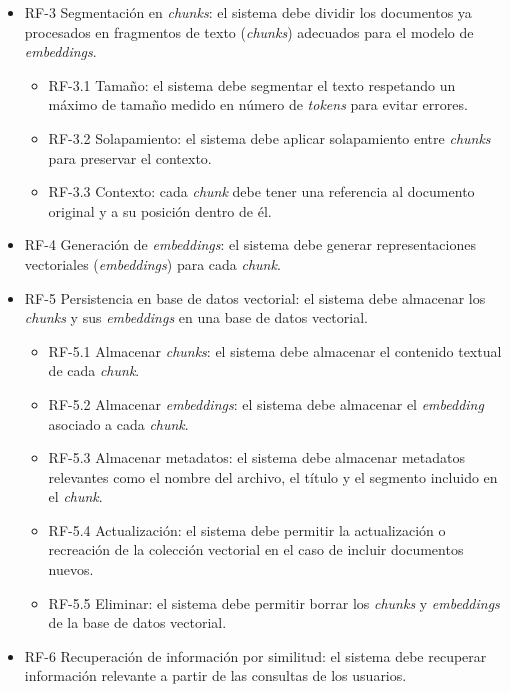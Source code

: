 \begin{itemize}
\begin{itemize}
\begin{itemize}
		\end{itemize}
	\end{itemize}
	\item RF-3 Segmentación en \textit{chunks}: el sistema debe dividir los documentos ya procesados en fragmentos de texto (\textit{chunks}) adecuados para el modelo de \textit{embeddings}.
	\begin{itemize}
	\tightlist
		\item RF-3.1 Tamaño: el sistema debe segmentar el texto respetando un máximo de tamaño medido en número de \textit{tokens} para evitar errores.
		\item RF-3.2 Solapamiento: el sistema debe aplicar solapamiento entre \textit{chunks} para preservar el contexto.
		\item RF-3.3 Contexto: cada \textit{chunk} debe tener una referencia al documento original y a su posición dentro de él.
	\end{itemize}
	\item RF-4 Generación de \textit{embeddings}: el sistema debe generar representaciones vectoriales (\textit{embeddings}) para cada \textit{chunk}.
	\item RF-5 Persistencia en base de datos vectorial: el sistema debe almacenar los \textit{chunks} y sus \textit{embeddings} en una base de datos vectorial.
	\begin{itemize}
	\tightlist
		\item RF-5.1 Almacenar \textit{chunks}: el sistema debe almacenar el contenido textual de cada \textit{chunk}.
		\item RF-5.2 Almacenar \textit{embeddings}: el sistema debe almacenar el \textit{embedding} asociado a cada \textit{chunk}.
		\item RF-5.3 Almacenar metadatos: el sistema debe almacenar metadatos relevantes como el nombre del archivo, el título y el segmento incluido en el \textit{chunk}.
		\item RF-5.4 Actualización: el sistema debe permitir la actualización o recreación de la colección vectorial en el caso de incluir documentos nuevos.
		\item RF-5.5 Eliminar: el sistema debe permitir borrar los \textit{chunks} y \textit{embeddings} de la base de datos vectorial.
	\end{itemize}
	\item RF-6 Recuperación de información por similitud: el sistema debe recuperar información relevante a partir de las consultas de los usuarios.
	\begin{itemize}

\end{itemize}
\end{itemize}
